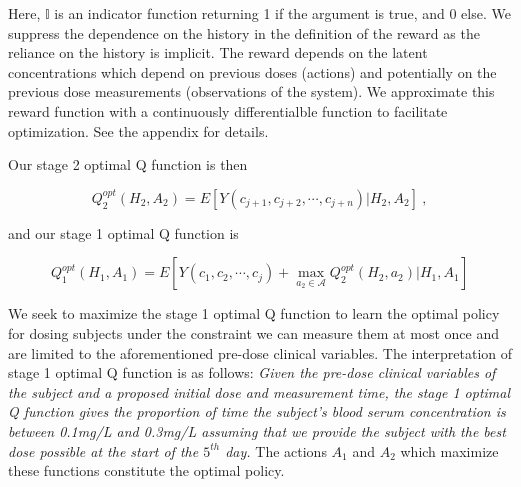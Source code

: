 \noindent Here, $ \mathbb{I} $ is an indicator function returning 1 if the argument is true, and 0 else.  
%
We suppress the dependence on the history in the definition of the reward as the reliance on the history is implicit.  The reward depends on the latent concentrations which depend on previous doses (actions) and potentially on the previous dose measurements (observations of the system).  We approximate this reward function with a continuously differentialble function to facilitate optimization.  See the appendix for details.  


Our stage 2 optimal Q function is then

\begin{equation}
Q_{2}^{o p t}\left(H_{2}, A_{2}\right)=E\left[Y\left(c_{j+1}, c_{j+2}, \cdots, c_{j+n}\right) \Bigg\vert H_{2}, A_{2}\right] \>,
\end{equation}

\noindent and our stage 1 optimal Q function is

\begin{equation}
Q_{1}^{o p t}\left(H_{1}, A_{1}\right)= E \left[Y\left(c_{1}, c_{2}, \cdots, c_{j}\right)+\max _{a_{2} \in \mathscr{A}} Q_{2}^{o p t}\left(H_{2}, a_{2}\right) \Bigg\vert H_{1}, A_{1}\right]
\end{equation}

We seek to maximize the stage 1 optimal Q function to learn the optimal policy for dosing subjects under the constraint we can measure them at most once and are limited to the aforementioned pre-dose clinical variables.  The interpretation of stage 1 optimal Q function is as follows:\textit{ Given the pre-dose clinical variables of the subject and a proposed initial dose and measurement time, the stage 1 optimal Q function gives the proportion of time the subject’s blood serum concentration is between 0.1mg/L and 0.3mg/L assuming that we provide the subject with the best dose possible at the start of the $ 5^{th} $ day.}  The actions $ A_1 $ and $ A_2 $ which maximize these functions constitute the optimal policy.


